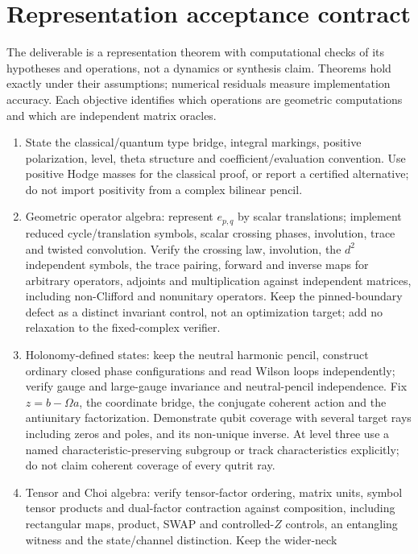 \documentclass[11pt]{article}
\theoremstyle{definition}
\theoremstyle{remark}
\begin{document}
\section{Representation acceptance contract}\label{sec:validation}

The deliverable is a representation theorem with computational checks of
its hypotheses and operations, not a dynamics or synthesis claim. Theorems
hold exactly under their assumptions; numerical residuals measure
implementation accuracy. Each objective identifies which operations are
geometric computations and which are independent matrix oracles.
\begin{enumerate}[label=V\arabic*.,leftmargin=*]
\item State the classical/quantum type bridge, integral markings, positive
polarization, level, theta structure and coefficient/evaluation convention.
Use positive Hodge masses for the classical proof, or report a certified
alternative; do not import positivity from a complex bilinear pencil.
\item Geometric operator algebra: represent $e_{p,q}$ by scalar
translations; implement reduced cycle/translation symbols, scalar crossing
phases, involution, trace and twisted convolution. Verify the crossing law,
involution, the $d^2$ independent symbols, the trace pairing, forward and
inverse maps for arbitrary operators, adjoints and multiplication against
independent matrices, including non-Clifford and nonunitary operators.
Keep the pinned-boundary defect as a distinct invariant control, not an
optimization target; add no relaxation to the fixed-complex verifier.
\item Holonomy-defined states: keep the neutral harmonic pencil, construct
ordinary closed phase configurations and read Wilson loops independently;
verify gauge and large-gauge invariance and neutral-pencil independence.
Fix $z=b-\Omega a$, the coordinate bridge, the conjugate coherent action
and the antiunitary factorization. Demonstrate qubit coverage with several
target rays including zeros and poles, and its non-unique inverse. At level
three use a named characteristic-preserving subgroup or track
characteristics explicitly; do not claim coherent coverage of every qutrit
ray.
\item Tensor and Choi algebra: verify tensor-factor ordering, matrix units,
symbol tensor products and dual-factor contraction against composition,
including rectangular maps, product, SWAP and controlled-$Z$ controls, an
entangling witness and the state/channel distinction. Keep the wider-neck

\end{enumerate}
\end{document}
